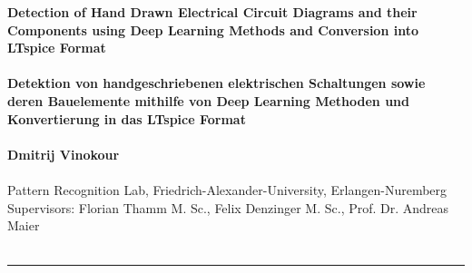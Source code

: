 \documentclass{article} %
\begin{document}
\begin{center}

\textbf{
\huge{Detection of Hand Drawn Electrical Circuit Diagrams and their Components using Deep Learning Methods and Conversion into LTspice Format}
\\~\\
\large{Detektion von handgeschriebenen elektrischen Schaltungen sowie deren Bauelemente mithilfe von Deep Learning Methoden und Konvertierung in das LTspice Format}
\\~\\
Dmitrij Vinokour
\\~\\
}
Pattern Recognition Lab, Friedrich-Alexander-University, Erlangen-Nuremberg
\\
Supervisors: Florian Thamm M. Sc., Felix Denzinger M. Sc., Prof. Dr. Andreas Maier
\\~\\
\noindent\rule{\textwidth}{1pt}
\end{center}






\end{document}
